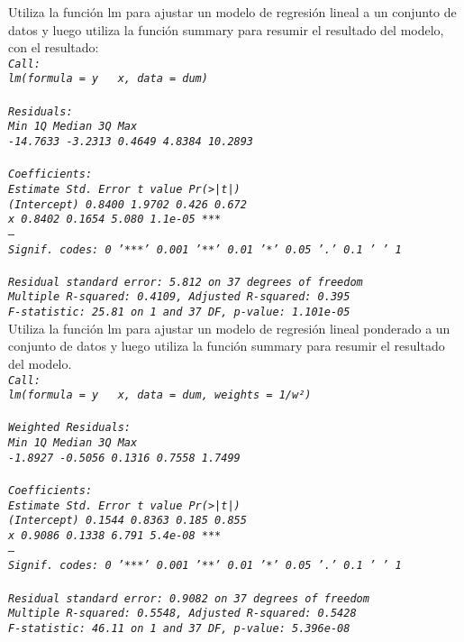 \documentclass[
12pt, 
spanish, 
singlespacing,
headsepline
]{article}
\newcommand{\code}[1]{\textit{\texttt{#1}}}
\begin{document}
Utiliza la función lm para ajustar un modelo de regresión lineal a un conjunto de datos y luego utiliza la función summary para resumir el resultado del modelo, con el resultado:
\\
\code{Call:\\
lm(formula = y ~ x, data = dum)\\
\\
Residuals:\\
     Min       1Q   Median       3Q      Max \\
-14.7633  -3.2313   0.4649   4.8384  10.2893 \\
\\
Coefficients:\\
            Estimate Std. Error t value Pr(>|t|)   \\ 
(Intercept)   0.8400     1.9702   0.426    0.672    \\
x             0.8402     0.1654   5.080  1.1e-05 ***\\
---\\
Signif. codes:  0 '***' 0.001 '**' 0.01 '*' 0.05 '.' 0.1 ' ' 1\\
\\
Residual standard error: 5.812 on 37 degrees of freedom\\
Multiple R-squared:  0.4109,	Adjusted R-squared:  0.395 \\
F-statistic: 25.81 on 1 and 37 DF,  p-value: 1.101e-05}
\\

Utiliza la función lm para ajustar un modelo de regresión lineal ponderado a un conjunto de datos y luego utiliza la función summary para resumir el resultado del modelo.
\\
\code{Call:\\
lm(formula = y ~ x, data = dum, weights = 1/w²)\\
\\
Weighted Residuals:\\
    Min      1Q  Median      3Q     Max \\
-1.8927 -0.5056  0.1316  0.7558  1.7499 \\
\\
Coefficients:\\
            Estimate Std. Error t value Pr(>|t|)    \\
(Intercept)   0.1544     0.8363   0.185    0.855    \\
x             0.9086     0.1338   6.791  5.4e-08 ***\\
---\\
Signif. codes:  0 '***' 0.001 '**' 0.01 '*' 0.05 '.' 0.1 ' ' 1\\
\\
Residual standard error: 0.9082 on 37 degrees of freedom\\
Multiple R-squared:  0.5548,	Adjusted R-squared:  0.5428 \\
F-statistic: 46.11 on 1 and 37 DF,  p-value: 5.396e-08}
\\
\end{document}
